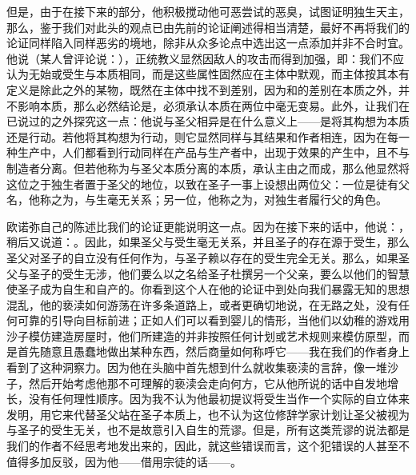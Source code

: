 但是，由于在接下来的部分，他积极搅动他可恶尝试的恶臭，试图证明独生天主，那么，鉴于我们对此头的观点已由先前的论证阐述得相当清楚，最好不再将我们的论证同样陷入同样恶劣的境地，除非从众多论点中选出这一点添加并非不合时宜。他说（某人曾评论说：），正统教义显然因敌人的攻击而得到加强，即：我们不应认为无始或受生与本质相同，而是这些属性固然应在主体中默观，而主体按其本有定义是除此之外的某物，既然在主体中找不到差别，因为和的差别在本质之外，并不影响本质，那么必然结论是，必须承认本质在两位中毫无变易。此外，让我们在已说过的之外探究这一点：他说与圣父相异是在什么意义上——是将其构想为本质还是行动。若他将其构想为行动，则它显然同样与其结果和作者相连，因为在每一种生产中，人们都看到行动同样在产品与生产者中，出现于效果的产生中，且不与制造者分离。但若他称为与圣父本质分离的本质，承认主由之而成，那么他显然将这位之于独生者置于圣父的地位，以致在圣子一事上设想出两位父：一位是徒有父名，他称之为，与生毫无关系；另一位，他称之为，对独生者履行父的角色。\par

欧诺弥自己的陈述比我们的论证更能说明这一点。因为在接下来的话中，他说：，稍后又说道：。因此，如果圣父与受生毫无关系，并且圣子的存在源于受生，那么圣父对圣子的自立没有任何作为，与圣子赖以存在的受生完全无关。那么，如果圣父与圣子的受生无涉，他们要么以之名给圣子杜撰另一个父亲，要么以他们的智慧使圣子成为自生和自产的。你看到这个人在他的论证中到处向我们暴露无知的思想混乱，他的亵渎如何游荡在许多条道路上，或者更确切地说，在无路之处，没有任何可靠的引导向目标前进；正如人们可以看到婴儿的情形，当他们以幼稚的游戏用沙子模仿建造房屋时，他们所建造的并非按照任何计划或艺术规则来模仿原型，而是首先随意且愚蠢地做出某种东西，然后商量如何称呼它——我在我们的作者身上看到了这种洞察力。因为他在头脑中首先想到什么就收集亵渎的言辞，像一堆沙子，然后开始考虑他那不可理解的亵渎会走向何方，它从他所说的话中自发地增长，没有任何理性顺序。因为我不认为他最初提议将受生当作一个实际的自立体来发明，用它来代替圣父站在圣子本质上，也不认为这位修辞学家计划让圣父被视为与圣子的受生无关，也不是故意引入自生的荒谬。但是，所有这类荒谬的说法都是我们的作者不经思考地发出来的，因此，就这些错误而言，这个犯错误的人甚至不值得多加反驳，因为他——借用宗徒的话——。\par

